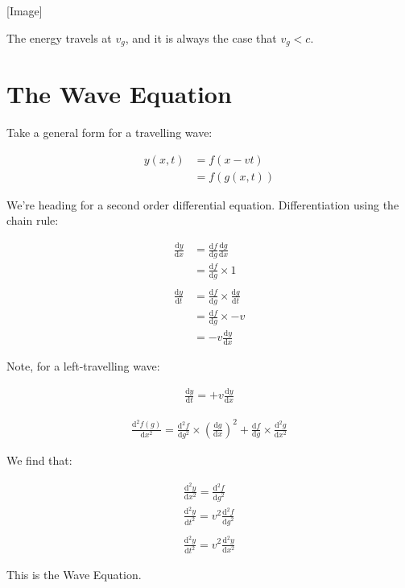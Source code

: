 \documentclass[10pt,a4paper]{article}
\newcommand{\rmd}{\mathrm{d}}
\newcommand{\dif}[2]{\frac{\rmd #1}{\rmd #2}}
\newcommand{\difn}[3]{\frac{\rmd^{#3} #1}{\rmd #2^{#3}}}
\begin{document}
\vspace*{10pt}
[Image]
\vspace*{10pt}

The energy travels at $v_g$, and it is always the case that $v_g < c$.

\section*{The Wave Equation}

Take a general form for a travelling wave:

\begin{align*}
y(x, t) &= f(x - vt) \\
&= f(g(x, t))
\end{align*}

We're heading for a second order differential equation. Differentiation using the chain rule:

\begin{align*}
\dif{y}{x} &= \dif{f}{g} \dif{g}{x} \\
&= \dif{f}{g} \times 1 \\
\\
\dif{y}{t} &= \dif{f}{g} \times \dif{g}{t} \\
&= \dif{f}{g} \times -v \\
&= -v \dif{y}{x}
\end{align*}

Note, for a left-travelling wave:

\begin{align*}
\dif{y}{t} = + v \dif{y}{x}
\end{align*}

\begin{align*}
\difn{f(g)}{x}{2} = \difn{f}{g}{2} \times \left( \dif{g}{x} \right) ^2 + \dif{f}{g} \times \difn{g}{x}{2}
\end{align*}

We find that:

\begin{align*}
\difn{y}{x}{2} = \difn{f}{g}{2} \\
\difn{y}{t}{2} = v^2 \difn{f}{g}{2} \\
\\
\difn{y}{t}{2} = v^2 \difn{y}{x}{2}
\end{align*}

This is the Wave Equation.
\end{document}
